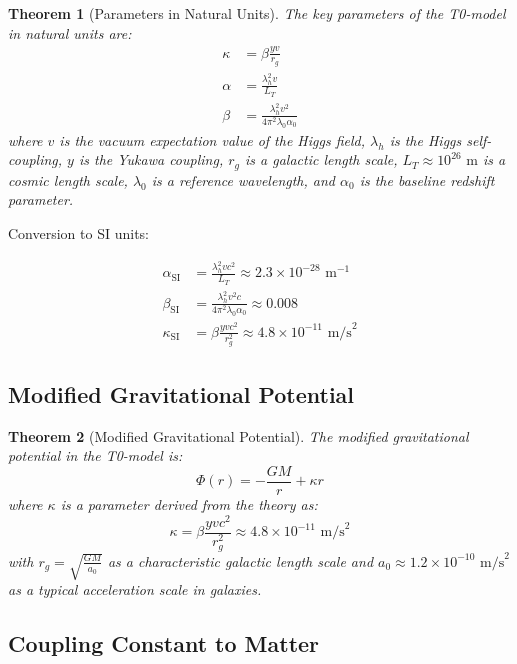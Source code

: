 \documentclass[a4paper,12pt]{article}
\newtheorem{theorem}{Theorem}[section]
\theoremstyle{definition}
\theoremstyle{remark}
\begin{document}
	\begin{theorem}[Parameters in Natural Units]
		The key parameters of the T0-model in natural units are:
		\begin{align}
			\kappa &= \beta \frac{y v}{r_g} \\
			\alpha &= \frac{\lambda_h^2 v}{L_T} \\
			\beta &= \frac{\lambda_h^2 v^2}{4\pi^2 \lambda_0 \alpha_0}
		\end{align}
		where \(v\) is the vacuum expectation value of the Higgs field, \(\lambda_h\) is the Higgs self-coupling, \(y\) is the Yukawa coupling, \(r_g\) is a galactic length scale, \(L_T \approx 10^{26} \text{ m}\) is a cosmic length scale, \(\lambda_0\) is a reference wavelength, and \(\alpha_0\) is the baseline redshift parameter.
	\end{theorem}
	
	Conversion to SI units:
	
	\begin{align}
		\alpha_{\text{SI}} &= \frac{\lambda_h^2 v c^2}{L_T} \approx 2.3 \times 10^{-28} \text{ m}^{-1} \\
		\beta_{\text{SI}} &= \frac{\lambda_h^2 v^2 c}{4\pi^2 \lambda_0 \alpha_0} \approx 0.008 \\
		\kappa_{\text{SI}} &= \beta \frac{y v c^2}{r_g^2} \approx 4.8 \times 10^{-11} \text{ m/s}^2
	\end{align}
	
	\subsection{Modified Gravitational Potential}
	
	\begin{theorem}[Modified Gravitational Potential]
		The modified gravitational potential in the T0-model is:
		\begin{equation}
			\Phi(r) = -\frac{GM}{r} + \kappa r
		\end{equation}
		where \(\kappa\) is a parameter derived from the theory as:
		\begin{equation}
			\kappa = \beta \frac{y v c^2}{r_g^2} \approx 4.8 \times 10^{-11} \text{ m/s}^2
		\end{equation}
		with \(r_g = \sqrt{\frac{GM}{a_0}}\) as a characteristic galactic length scale and \(a_0 \approx 1.2 \times 10^{-10} \text{ m/s}^2\) as a typical acceleration scale in galaxies.
	\end{theorem}
	
	\subsection{Coupling Constant to Matter}
	
\end{document}
